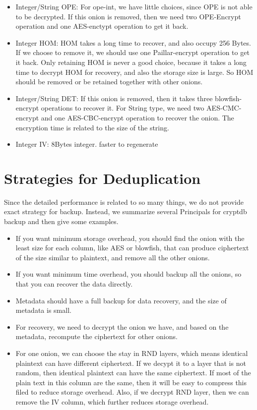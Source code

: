 \begin{itemize}
\item Integer/String OPE: For ope-int, we have little choices, since OPE is not able to be decrypted. If this onion is removed, then we need two OPE-Encrypt operation and one AES-enctypt operation to get it back. 
\item Integer HOM: HOM takes a long time to recover, and also occupy 256 Bytes. If we choose to remove it, we should use one Paillar-encrypt operation to get it back. Only retaining HOM is never a good choice, because it takes a long time to decrypt HOM for recovery, and also the storage size is large. So HOM should be removed or be retained together with other onions.
\item Integer/String DET: If this onion is removed, then it takes three blowfish-encrypt operations to recover it. For String type, we need two AES-CMC-encrypt and one AES-CBC-encrypt operation to recover the onion. The encryption time is related to the size of the string.
\item Integer IV: 8Bytes integer. faster to regenerate
\end{itemize}


\section{Strategies for Deduplication}
Since the detailed performance is related to so many things, we do not provide exact strategy for backup. Instead, we summarize several Principals for cryptdb backup and then give some examples. 

\begin{itemize}
\item If you want minimum storage overhead, you should find the onion with the least size for each column, like AES or blowfish, that can produce ciphertext of the size similar to plaintext, and remove all the other onions. 
\item If you want minimum time overhead, you should backup all the onions, so that you can recover the data directly.
\item Metadata should have a full backup for data recovery, and the size of metadata is small. 
\item For recovery, we need to decrypt the onion we have, and based on the metadata, recompute the ciphertext for other onions.
\item For one onion, we can choose the stay in RND layers, which means identical plaintext can have different ciphertext. If we decypt it to a layer that is not random, then identical plaintext can have the same ciphertext. If most of the plain text in this column are the same, then it will be easy to compress this filed to reduce storage overhead. Also, if we decrypt RND layer, then we can remove the IV column, which further reduces storage overhead.
\end{itemize}


